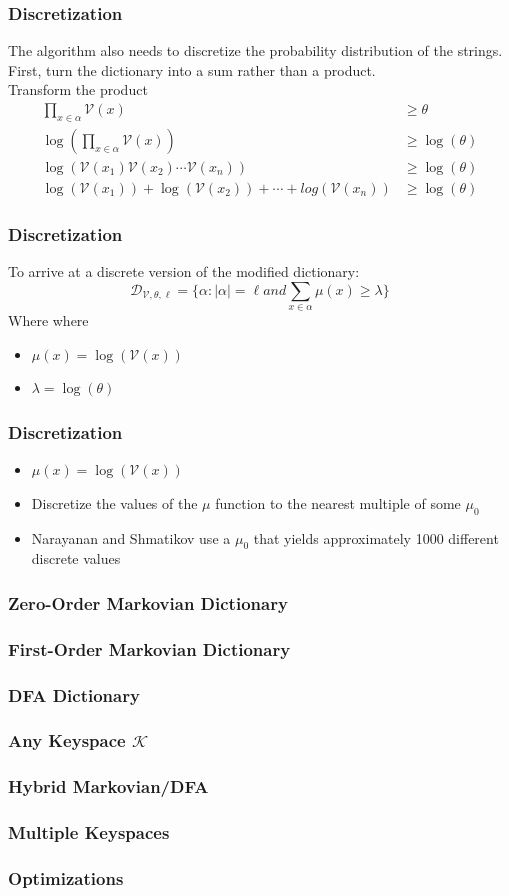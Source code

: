 \documentclass{beamer}
\newenvironment{where}{\noindent{}where\begin{itemize}}{\end{itemize}}
\begin{document}
\begin{frame}
\frametitle{Discretization}
The algorithm also needs to discretize the probability distribution of the strings. First, turn the dictionary into a sum rather than a product. \\
Transform the product
\begin{align*}
\prod_{x \in \alpha}\mathcal{V}(x) & \geq \theta \\
\log(\prod_{x \in \alpha}\mathcal{V}(x)) & \geq \log(\theta) \\
\log(\mathcal{V}(x_1)\mathcal{V}(x_2)\dotsb \mathcal{V}(x_n)) & \geq \log(\theta) \\
\log(\mathcal{V}(x_1)) + \log(\mathcal{V}(x_2)) + \dotsb + log(\mathcal{V}(x_n)) & \geq \log(\theta)
\end{align*}
\end{frame}

\begin{frame}
\frametitle{Discretization}
To arrive at a discrete version of the modified dictionary:
\begin{equation*}
\mathcal{D}_{\mathcal{V},\theta,\ell} = \lbrace \alpha :  \lvert \alpha \rvert = \ell and \sum_{x \in \alpha}\mu(x) \geq \lambda \rbrace
\end{equation*}
Where
\begin{where}
\item $\mu(x) = \log(\mathcal{V}(x))$
\item $\lambda = \log(\theta)$ 
\end{where}
\end{frame}

\begin{frame}
\frametitle{Discretization}
\begin{itemize}
\item $\mu(x) = \log(\mathcal{V}(x))$
\item Discretize the values of the $\mu$ function to the nearest multiple of some $\mu_0$
\item Narayanan and Shmatikov use a $\mu_0$ that yields approximately 1000 different discrete values
\end{itemize}
\end{frame}

\begin{frame}
\frametitle{Zero-Order Markovian Dictionary}
\end{frame}
\begin{frame}
\frametitle{First-Order Markovian Dictionary}
\end{frame}
\begin{frame}
\frametitle{DFA Dictionary}
\end{frame}
\begin{frame}
\frametitle{Any Keyspace $\mathcal{K}$}
\end{frame}
\begin{frame}
\frametitle{Hybrid Markovian/DFA}
\end{frame}
\begin{frame}
\frametitle{Multiple Keyspaces}
\end{frame}
\begin{frame}
\frametitle{Optimizations}
\end{frame}
\end{document}
